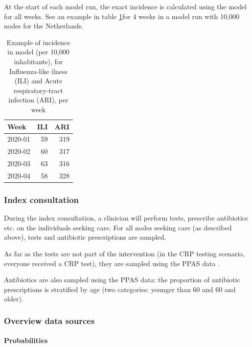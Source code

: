 \documentclass[
]{article}
\begin{document}
At the start of each model run, the exact incidence is calculated using the model for all weeks. See an example in table \ref{tab:example-incidence}for 4 weeks in a model run with 10,000 nodes for the Netherlands.

\begin{table}

\caption{\label{tab:example-incidence}Example of incidence in model (per 10,000 inhabitants), for Influenza-like ilness (ILI) and Acute respiratory-tract infection (ARI), per week}
\centering
\begin{tabular}[t]{l|r|r}
\hline
Week & ILI & ARI\\
\hline
2020-01 & 59 & 319\\
\hline
2020-02 & 60 & 317\\
\hline
2020-03 & 63 & 316\\
\hline
2020-04 & 58 & 328\\
\hline
\end{tabular}
\end{table}

\hypertarget{index-consultation}{%
\subsubsection{Index consultation}\label{index-consultation}}

During the index consultation, a clinician will perform tests, prescribe antibiotics etc. on the individuals seeking care. For all nodes seeking care (as described above), tests and antibiotic prescriptions are sampled.

As far as the tests are not part of the intervention (in the CRP testing scenario, everyone received a CRP test), they are sampled using the PPAS data \autocite{veldenPrimaryCarePatients2021}.

Antibiotics are also sampled using the PPAS data: the proportion of antibiotic prescriptions is stratified by age (two categories: younger than 60 and 60 and older).

\hypertarget{overview-data-sources-1}{%
\subsubsection{Overview data sources}\label{overview-data-sources-1}}

\hypertarget{probabilities}{%
\paragraph{Probabilities}\label{probabilities}}
\end{document}
